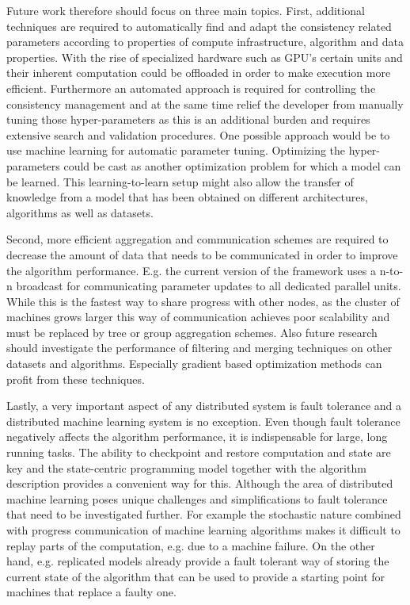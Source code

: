 Future work therefore should focus on three main topics.
First, additional techniques are required to automatically find and adapt the consistency related parameters according to properties of compute infrastructure, algorithm and data properties.
With the rise of specialized hardware such as GPU's certain units and their inherent computation could be offloaded in order to make execution more efficient.
Furthermore an automated approach is required for controlling the consistency management and at the same time relief the developer from manually tuning those hyper-parameters as this is an additional burden and requires extensive search and validation procedures.
One possible approach would be to use machine learning for automatic parameter tuning.
Optimizing the hyper-parameters could be cast as another optimization problem for which a model can be learned.
This learning-to-learn setup might also allow the transfer of knowledge from a model that has been obtained on different architectures, algorithms as well as datasets.

Second, more efficient aggregation and communication schemes are required to decrease the amount of data that needs to be communicated in order to improve the algorithm performance.
E.g. the current version of the framework uses a n-to-n broadcast for communicating parameter updates to all dedicated parallel units.
While this is the fastest way to share progress with other nodes, as the cluster of machines grows larger this way of communication achieves poor scalability and must be replaced by tree or group aggregation schemes.
Also future research should investigate the performance of filtering and merging techniques on other datasets and algorithms. Especially gradient based optimization methods can profit from these techniques.

Lastly, a very important aspect of any distributed system is fault tolerance and a distributed machine learning system is no exception.
Even though fault tolerance negatively affects the algorithm performance, it is indispensable for large, long running tasks.
The ability to checkpoint and restore computation and state are key and the state-centric programming model together with the algorithm description provides a convenient way for this.
Although the area of distributed machine learning poses unique challenges and simplifications to fault tolerance that need to be investigated further.
For example the stochastic nature combined with progress communication of machine learning algorithms makes it difficult to replay parts of the computation, e.g. due to a machine failure.
On the other hand, e.g. replicated models already provide a fault tolerant way of storing the current state of the algorithm that can be used to provide a starting point for machines that replace a faulty one.
